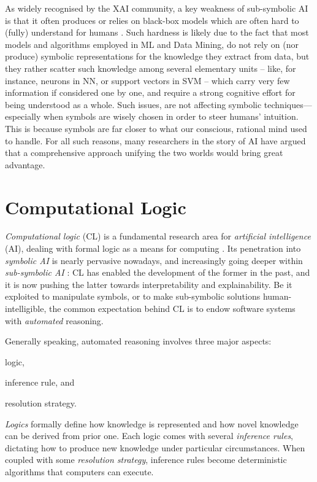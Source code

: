 \documentclass[12pt,a4paper,openright,twoside]{book}
\begin{document}
As widely recognised by the XAI community, a key weakness of sub-symbolic AI is that it often produces or relies on black-box models which are often hard to (fully) understand for humans \cite{GuidottiMRTGP19}.
%
Such hardness is likely due to the fact that most models and algorithms employed in ML and Data Mining, do not rely on (nor produce) symbolic representations for the knowledge they extract from data, but they rather scatter such knowledge among several elementary units -- like, for instance, neurons in NN, or support vectors in SVM -- which carry very few information if considered one by one, and require a strong cognitive effort for being understood as a whole.
%
Such issues, are not affecting symbolic techniques---especially when symbols are wisely chosen in order to steer humans' intuition.
%
This is because symbols are far closer to what our conscious, rational mind used to handle.
%
For all such reasons, many researchers in the story of AI have argued that a comprehensive approach unifying the two worlds would bring great advantage.

\section{Computational Logic}

\emph{Computational logic} (CL) \cite{lloyd1990computational} is a fundamental research area for \emph{artificial intelligence} (AI), dealing with formal logic as a means for computing \cite{Paulson2018}.
%
Its penetration into \emph{symbolic AI} is nearly pervasive nowadays, and increasingly going deeper within \emph{sub-symbolic AI} \cite{xaisurvey-ia14,lptech4mas-jaamas35}: CL has enabled the development of the former in the past, and it is now pushing the latter towards interpretability and explainability.
%
Be it exploited to manipulate symbols, or to make sub-symbolic solutions human-intelligible, the common expectation behind CL is to endow software systems with \emph{automated} reasoning.

Generally speaking, automated reasoning involves three major aspects:
%
\begin{inlinelist}
    \item logic,
    \item inference rule, and
    \item resolution strategy.
\end{inlinelist}
%
\emph{Logics} formally define how knowledge is represented and how novel knowledge can be derived from prior one.
%
Each logic comes with several \emph{inference rules}, dictating how to produce new knowledge under particular circumstances.
%
When coupled with some \emph{resolution strategy}, inference rules become deterministic algorithms that computers can execute.
\end{document}
